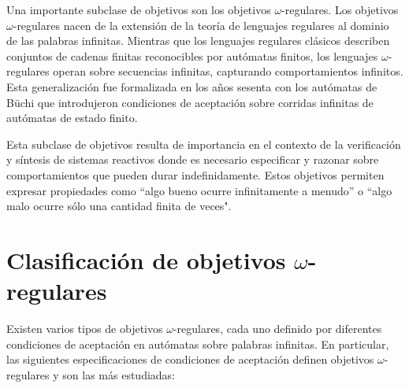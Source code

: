 
Una importante subclase de objetivos son los objetivos $\omega$-regulares. Los
objetivos $\omega$-regulares nacen de la extensión de la teoría de lenguajes
regulares al dominio de las palabras infinitas. Mientras que los lenguajes
regulares clásicos describen conjuntos de cadenas finitas reconocibles por
autómatas finitos, los lenguajes $\omega$-regulares operan sobre secuencias
infinitas, capturando comportamientos infinitos. Esta generalización fue
formalizada en los años sesenta con los autómatas de Büchi que introdujeron
condiciones de aceptación sobre corridas infinitas de autómatas de estado
finito.

Esta subclase de objetivos resulta de importancia en el contexto de la
verificación y síntesis de sistemas reactivos donde es necesario especificar y
razonar sobre comportamientos que pueden durar indefinidamente. Estos objetivos
permiten expresar propiedades como ``algo bueno ocurre infinitamente a menudo''
o ``algo malo ocurre sólo una cantidad finita de veces".

\section{Clasificación de objetivos $\omega$-regulares}

Existen varios tipos de objetivos $\omega$-regulares, cada uno definido por
diferentes condiciones de aceptación en autómatas sobre palabras infinitas. En
particular, las siguientes especificaciones de condiciones de aceptación
definen objetivos $\omega$-regulares y son las más estudiadas:


